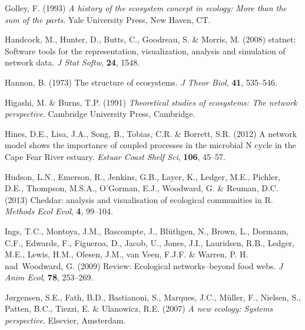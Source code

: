 \documentclass[11pt]{article}
\begin{document}
\begin{thebibliography}{79}
Golley, F. (1993) \emph{A history of the ecosystem concept in ecology: More
  than the sum of the parts}.
\newblock Yale University Press, New Haven, CT.

Handcock, M., Hunter, D., Butts, C., Goodreau, S. \& Morris, M. (2008) statnet:
  Software tools for the representation, visualization, analysis and simulation
  of network data.
\newblock \emph{J Stat Softw}, \textbf{24}, 1548.

Hannon, B. (1973) The structure of ecosystems.
\newblock \emph{J Theor Biol}, \textbf{41}, 535--546.

Higashi, M. \& Burns, T.P. (1991) \emph{Theoretical studies of ecosystems: The
  network perspective}.
\newblock Cambridge University Press, Cambridge.

Hines, D.E., Lisa, J.A., Song, B., Tobias, C.R. \& Borrett, S.R. (2012) A
  network model shows the importance of coupled processes in the microbial {N}
  cycle in the {Cape Fear River} estuary.
\newblock \emph{Estuar Coast Shelf Sci}, \textbf{106}, 45--57.

Hudson, L.N., Emerson, R., Jenkins, G.B., Layer, K., Ledger, M.E., Pichler,
  D.E., Thompson, M.S.A., O'Gorman, E.J., Woodward, G. \& Reuman, D.C. (2013)
  Cheddar: analysis and visualisation of ecological communities in {R}.
\newblock \emph{Methods Ecol Evol}, \textbf{4}, 99--104.

Ings, T.C., Montoya, J.M., Bascompte, J., Bl{\"u}thgen, N., Brown, L., Dormann,
  C.F., Edwards, F., Figueroa, D., Jacob, U., Jones, J.I., Lauridsen, R.B.,
  Ledger, M.E., Lewis, H.M., Olesen, J.M., van Veen, F.J.F. \& Warren, P. H.
  nad~Woodward, G. (2009) Review: Ecological networks--beyond food webs.
\newblock \emph{J Anim Ecol}, \textbf{78}, 253--269.

J{\o}rgensen, S.E., Fath, B.D., Bastianoni, S., Marques, J.C., M\"{u}ller, F.,
  Nielsen, S., Patten, B.C., Tiezzi, E. \& Ulanowicz, R.E. (2007) \emph{A new
  ecology: Systems perspective}.
\newblock Elsevier, Amsterdam.


\end{thebibliography}
\end{document}
